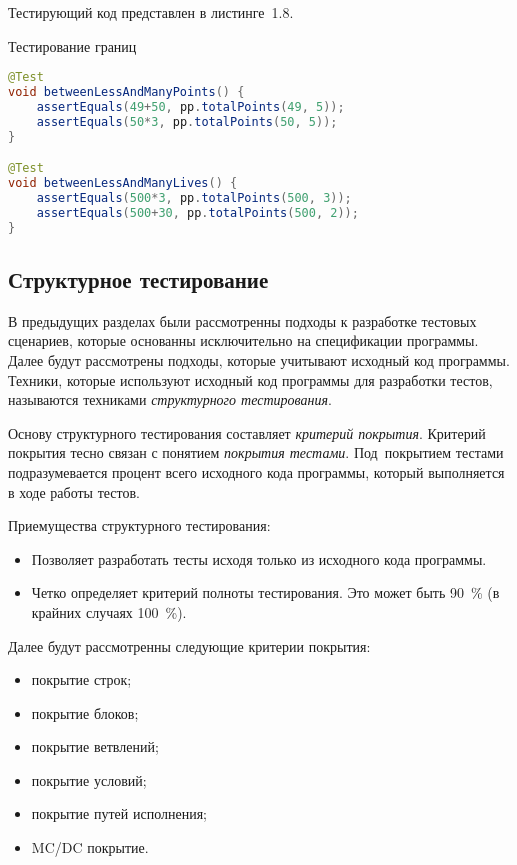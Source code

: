 Тестирующий код представлен в листинге~1.8.

\begin{ListingEnv}[!h]%
	\captiondelim{ } %
	\caption{Тестирование границ}
	\begin{lstlisting}[language={Java}]
@Test
void betweenLessAndManyPoints() {
	assertEquals(49+50, pp.totalPoints(49, 5));
	assertEquals(50*3, pp.totalPoints(50, 5));
}

@Test
void betweenLessAndManyLives() {
	assertEquals(500*3, pp.totalPoints(500, 3));
	assertEquals(500+30, pp.totalPoints(500, 2));
}
	\end{lstlisting}
\end{ListingEnv}%



\subsection{Структурное тестирование} 
 
В предыдущих разделах были рассмотренны подходы к разработке тестовых сценариев, которые основанны исключительно на спецификации программы. Далее будут рассмотрены подходы, которые учитывают исходный код программы. Техники, которые используют исходный код программы для разработки тестов, называются техниками \textit{структурного тестирования}.

Основу структурного тестирования составляет \textit{критерий покрытия}. Критерий покрытия тесно связан с понятием \textit{покрытия тестами}. Под~покрытием тестами подразумевается процент всего исходного кода программы, который выполняется в ходе работы тестов.

Приемущества структурного тестирования:

\begin{itemize}
	\item Позволяет разработать тесты исходя только из исходного кода программы. 
	\item Четко определяет критерий полноты тестирования. Это может быть 90~\% (в крайних случаях 100~\%).
\end{itemize}


Далее будут рассмотренны следующие критерии покрытия:

\begin{itemize}
	\item покрытие строк;
	\item покрытие блоков;
	\item покрытие ветвлений;
	\item покрытие условий;
	\item покрытие путей исполнения;
	\item MC/DC покрытие.
\end{itemize}


